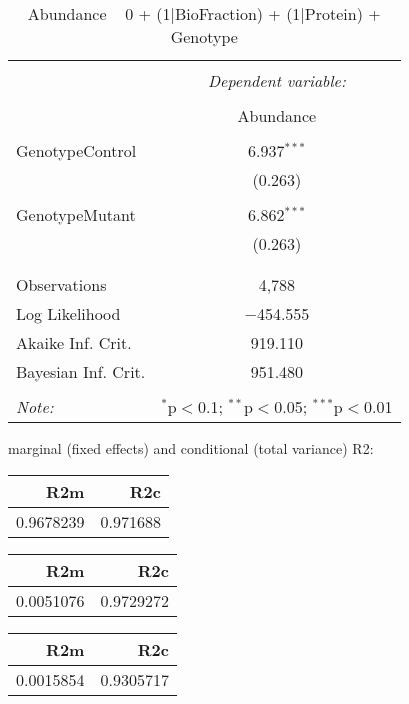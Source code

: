 \documentclass[11pt]{report}
\begin{document}
\begin{table}[!htbp] \centering 
  \caption{Abundance ~ 0 + (1|BioFraction) + (1|Protein) + Genotype} 
  \label{} 
\begin{tabular}{@{\extracolsep{5pt}}lc} 
\\[-1.8ex]\hline 
\hline \\[-1.8ex] 
 & \multicolumn{1}{c}{\textit{Dependent variable:}} \\ 
\cline{2-2} 
\\[-1.8ex] & Abundance \\ 
\hline \\[-1.8ex] 
 GenotypeControl & 6.937$^{***}$ \\ 
  & (0.263) \\ 
  & \\ 
 GenotypeMutant & 6.862$^{***}$ \\ 
  & (0.263) \\ 
  & \\ 
\hline \\[-1.8ex] 
Observations & 4,788 \\ 
Log Likelihood & $-$454.555 \\ 
Akaike Inf. Crit. & 919.110 \\ 
Bayesian Inf. Crit. & 951.480 \\ 
\hline 
\hline \\[-1.8ex] 
\textit{Note:}  & \multicolumn{1}{r}{$^{*}$p$<$0.1; $^{**}$p$<$0.05; $^{***}$p$<$0.01} \\ 
\end{tabular} 
\end{table} 
marginal (fixed effects) and conditional (total variance) R2:

\begin{tabular}{r|r}
\hline
R2m & R2c\\
\hline
0.9678239 & 0.971688\\
\hline
\end{tabular}

\begin{tabular}{r|r}
\hline
R2m & R2c\\
\hline
0.0051076 & 0.9729272\\
\hline
\end{tabular}

\begin{tabular}{r|r}
\hline
R2m & R2c\\
\hline
0.0015854 & 0.9305717\\
\hline
\end{tabular}
\end{document}
